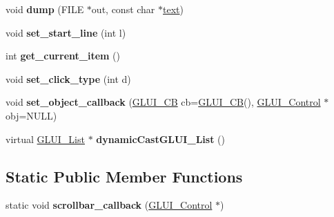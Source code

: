 \begin{DoxyCompactItemize}
\item 
\hypertarget{class_g_l_u_i___list_a89ccf441e37470107e513305f2d33f04}{void {\bfseries dump} (F\+I\+L\+E $\ast$out, const char $\ast$\hyperlink{class_g_l_u_i___control_af0d60e9736f4dbc34e9a536e75876d72}{text})}\label{class_g_l_u_i___list_a89ccf441e37470107e513305f2d33f04}

\item 
\hypertarget{class_g_l_u_i___list_ad0b1a917f4e192aaabc53bb8240c5cc5}{void {\bfseries set\+\_\+start\+\_\+line} (int l)}\label{class_g_l_u_i___list_ad0b1a917f4e192aaabc53bb8240c5cc5}

\item 
\hypertarget{class_g_l_u_i___list_a68ed3cc0219ba9ed96107c10d36e5ea4}{int {\bfseries get\+\_\+current\+\_\+item} ()}\label{class_g_l_u_i___list_a68ed3cc0219ba9ed96107c10d36e5ea4}

\item 
\hypertarget{class_g_l_u_i___list_a6ef479e96208a8167bc6f13c235542ba}{void {\bfseries set\+\_\+click\+\_\+type} (int d)}\label{class_g_l_u_i___list_a6ef479e96208a8167bc6f13c235542ba}

\item 
\hypertarget{class_g_l_u_i___list_a97cb9eaebaa4b9748c7d1dcb0225b3ce}{void {\bfseries set\+\_\+object\+\_\+callback} (\hyperlink{class_g_l_u_i___c_b}{G\+L\+U\+I\+\_\+\+C\+B} cb=\hyperlink{class_g_l_u_i___c_b}{G\+L\+U\+I\+\_\+\+C\+B}(), \hyperlink{class_g_l_u_i___control}{G\+L\+U\+I\+\_\+\+Control} $\ast$obj=N\+U\+L\+L)}\label{class_g_l_u_i___list_a97cb9eaebaa4b9748c7d1dcb0225b3ce}

\item 
\hypertarget{class_g_l_u_i___list_aa2a037c10f2977122e6defbe6f08e300}{virtual \hyperlink{class_g_l_u_i___list}{G\+L\+U\+I\+\_\+\+List} $\ast$ {\bfseries dynamic\+Cast\+G\+L\+U\+I\+\_\+\+List} ()}\label{class_g_l_u_i___list_aa2a037c10f2977122e6defbe6f08e300}

\end{DoxyCompactItemize}
\subsection*{Static Public Member Functions}
\begin{DoxyCompactItemize}
\item 
\hypertarget{class_g_l_u_i___list_a84d5aee131e5f785ab8c67f3fd96c910}{static void {\bfseries scrollbar\+\_\+callback} (\hyperlink{class_g_l_u_i___control}{G\+L\+U\+I\+\_\+\+Control} $\ast$)}\label{class_g_l_u_i___list_a84d5aee131e5f785ab8c67f3fd96c910}

\end{DoxyCompactItemize}
